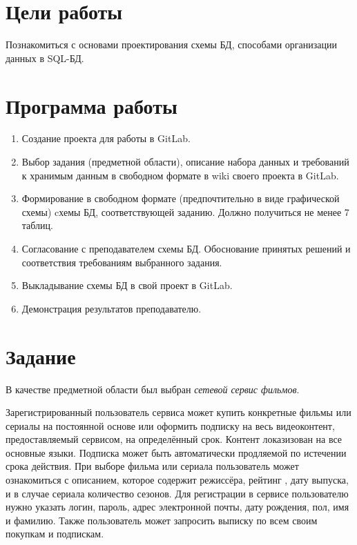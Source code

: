 





\tableofcontents
\newpage

\section{Цели работы}

Познакомиться с основами проектирования схемы БД, способами организации данных в SQL-БД. 

\section{Программа работы}

\begin{enumerate}
	\item Создание проекта для работы в GitLab.
	\item Выбор задания (предметной области), описание набора данных и требований к хранимым данным в свободном формате в wiki своего проекта в GitLab.
	\item Формирование в свободном формате (предпочтительно в виде графической схемы) cхемы БД, соответствующей заданию. Должно получиться не менее 7 таблиц.
	\item Согласование с преподавателем схемы БД. Обоснование принятых решений и соответствия требованиям выбранного задания. 
	\item Выкладывание схемы БД в свой проект в GitLab.
	\item Демонстрация результатов преподавателю.
\end{enumerate}


\section{Задание}

В качестве предметной области был выбран \textit{сетевой сервис фильмов}.

Зарегистрированный пользователь сервиса может купить конкретные фильмы или сериалы на постоянной основе или оформить подписку на весь видеоконтент, предоставляемый сервисом, на определённый срок. Контент локазизован на все основные языки. Подписка может быть автоматически продляемой по истечении срока действия. При выборе фильма или сериала пользователь может ознакомиться с описанием, которое содержит режиссёра, рейтинг , дату выпуска, и в случае сериала количество сезонов. Для регистрации в сервисе пользователю нужно указать логин, пароль, адрес электронной почты, дату рождения, пол, имя и фамилию. Также пользователь может запросить выписку по всем своим покупкам и подпискам.

